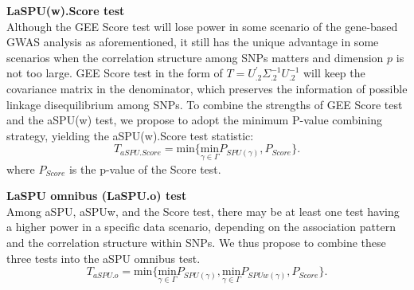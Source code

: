 \documentclass[12pt]{article}
\begin{document}
\textbf{LaSPU(w).Score test}\\
Although the {GEE Score test} will lose power in some scenario of the gene-based GWAS analysis as aforementioned, it still has the unique advantage in some scenarios when the correlation structure among SNPs matters and dimension $p$ is not too large. GEE Score test in the form of $T=U_{.2}^{'}\Sigma_{.2}^{-1}U_{.2}^{-1}$ will keep the covariance matrix in the denominator, which preserves the information of possible linkage disequilibrium among SNPs. To combine the strengths of GEE Score test and the aSPU(w) test, we propose to adopt the minimum P-value combining strategy, yielding the aSPU(w).Score test statistic:
$$
T_{aSPU.Score} = \textrm{min} \Big\{ \underset{\gamma\in\Gamma}{ \textrm{min} } P_{ SPU(\gamma) }, P_{Score} \Big\}.
$$ 
where $P_{Score}$ is the p-value of the Score test. 


\textbf{LaSPU omnibus (LaSPU.o) test}\\
Among aSPU, aSPUw, and the Score test, there may be at least one test having a higher power in a specific data scenario, depending on the association pattern and the correlation structure within SNPs. We thus propose to combine these three tests into the aSPU omnibus test. 
$$
T_{aSPU.o} = \textrm{min} \Big\{ \underset{\gamma\in\Gamma}{ \textrm{min} } P_{ SPU(\gamma) },\underset{\gamma\in\Gamma}{ \textrm{min} } P_{ SPUw(\gamma) }, P_{Score} \Big\}.
$$ 
\end{document}
